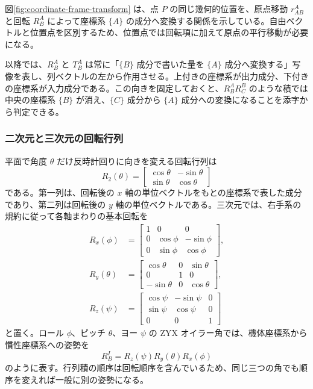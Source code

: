 図\ref{fig:coordinate-frame-transform} は、点 $P$ の同じ幾何的位置を、原点移動 $r^A_{AB}$ と回転 $R^A_B$ によって座標系 $\{A\}$ の成分へ変換する関係を示している。自由ベクトルと位置点を区別するため、位置点では回転項に加えて原点の平行移動が必要になる。

以降では、$R^A_B$ と $T^A_B$ は常に「$\{B\}$ 成分で書いた量を $\{A\}$ 成分へ変換する」写像を表し、列ベクトルの左から作用させる。上付きの座標系が出力成分、下付きの座標系が入力成分である。この向きを固定しておくと、$R^A_BR^B_C$ のような積では中央の座標系 $\{B\}$ が消え、$\{C\}$ 成分から $\{A\}$ 成分への変換になることを添字から判定できる。

\subsubsection{二次元と三次元の回転行列}

平面で角度 $\theta$ だけ反時計回りに向きを変える回転行列は
\begin{equation}
  R_2(\theta)=
  \begin{bmatrix}
    \cos\theta&-\sin\theta\\
    \sin\theta& \cos\theta
  \end{bmatrix}
\end{equation}
である。第一列は、回転後の $x$ 軸の単位ベクトルをもとの座標系で表した成分であり、第二列は回転後の $y$ 軸の単位ベクトルである。三次元では、右手系の規約に従って各軸まわりの基本回転を
\begin{align}
  R_x(\phi)&=
  \begin{bmatrix}
    1&0&0\\
    0&\cos\phi&-\sin\phi\\
    0&\sin\phi& \cos\phi
  \end{bmatrix},\\
  R_y(\theta)&=
  \begin{bmatrix}
    \cos\theta&0&\sin\theta\\
    0&1&0\\
    -\sin\theta&0&\cos\theta
  \end{bmatrix},\\
  R_z(\psi)&=
  \begin{bmatrix}
    \cos\psi&-\sin\psi&0\\
    \sin\psi& \cos\psi&0\\
    0&0&1
  \end{bmatrix}
\end{align}
と置く。ロール $\phi$、ピッチ $\theta$、ヨー $\psi$ の ZYX オイラー角では、機体座標系から慣性座標系への姿勢を
\begin{equation}
  R^I_B=R_z(\psi)R_y(\theta)R_x(\phi)
\end{equation}
のように表す。行列積の順序は回転順序を含んでいるため、同じ三つの角でも順序を変えれば一般に別の姿勢になる。

